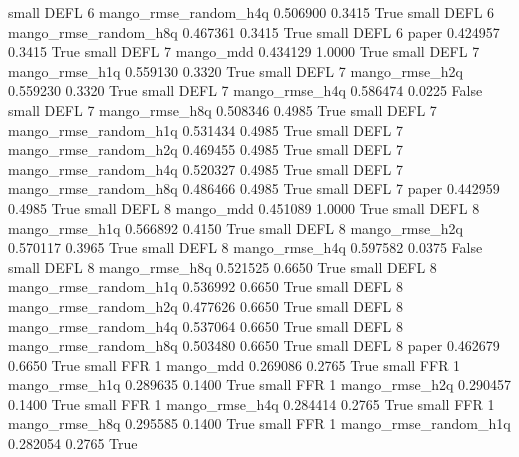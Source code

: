      small     DEFL                 6 mango_rmse_random_h4q   0.506900      0.3415    True
     small     DEFL                 6 mango_rmse_random_h8q   0.467361      0.3415    True
     small     DEFL                 6                 paper   0.424957      0.3415    True
     small     DEFL                 7             mango_mdd   0.434129      1.0000    True
     small     DEFL                 7        mango_rmse_h1q   0.559130      0.3320    True
     small     DEFL                 7        mango_rmse_h2q   0.559230      0.3320    True
     small     DEFL                 7        mango_rmse_h4q   0.586474      0.0225   False
     small     DEFL                 7        mango_rmse_h8q   0.508346      0.4985    True
     small     DEFL                 7 mango_rmse_random_h1q   0.531434      0.4985    True
     small     DEFL                 7 mango_rmse_random_h2q   0.469455      0.4985    True
     small     DEFL                 7 mango_rmse_random_h4q   0.520327      0.4985    True
     small     DEFL                 7 mango_rmse_random_h8q   0.486466      0.4985    True
     small     DEFL                 7                 paper   0.442959      0.4985    True
     small     DEFL                 8             mango_mdd   0.451089      1.0000    True
     small     DEFL                 8        mango_rmse_h1q   0.566892      0.4150    True
     small     DEFL                 8        mango_rmse_h2q   0.570117      0.3965    True
     small     DEFL                 8        mango_rmse_h4q   0.597582      0.0375   False
     small     DEFL                 8        mango_rmse_h8q   0.521525      0.6650    True
     small     DEFL                 8 mango_rmse_random_h1q   0.536992      0.6650    True
     small     DEFL                 8 mango_rmse_random_h2q   0.477626      0.6650    True
     small     DEFL                 8 mango_rmse_random_h4q   0.537064      0.6650    True
     small     DEFL                 8 mango_rmse_random_h8q   0.503480      0.6650    True
     small     DEFL                 8                 paper   0.462679      0.6650    True
     small      FFR                 1             mango_mdd   0.269086      0.2765    True
     small      FFR                 1        mango_rmse_h1q   0.289635      0.1400    True
     small      FFR                 1        mango_rmse_h2q   0.290457      0.1400    True
     small      FFR                 1        mango_rmse_h4q   0.284414      0.2765    True
     small      FFR                 1        mango_rmse_h8q   0.295585      0.1400    True
     small      FFR                 1 mango_rmse_random_h1q   0.282054      0.2765    True
